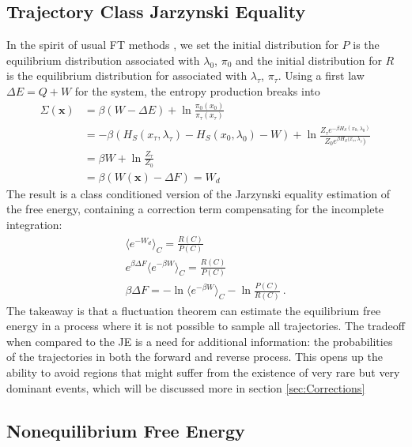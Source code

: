 \documentclass[paper=a4, fontsize=10pt]{article} %
\numberwithin{equation}{section} %
\numberwithin{figure}{section} %
\numberwithin{table}{section} %
\def\avg#1{\langle #1 \rangle}
\def \x {\mathbf{x} }
\begin{document}
\subsection{Trajectory Class Jarzynski Equality}\label{sec:TCJE}
In the spirit of usual FT methods , we set the initial distribution for $P$ is the equilibrium distribution associated with $\lambda_0$, $\pi_0$ and the initial distribution for $R$ is the equilibrium distribution for associated with $\lambda_\tau$, $\pi_\tau$. Using a first law $\Delta E = Q + W$ for the system, the entropy production breaks into
\begin{align}
\Sigma(\x) &= \beta (W-\Delta E) +  \ln \frac{\pi_0(x_0)}{\pi_\tau(x_\tau) }\\
 &= -\beta (H_S(x_\tau,\lambda_\tau)-H_S(x_0,\lambda_0) - W) + \ln \frac{ Z_\tau e^{-\beta H_S(x_0,\lambda_0)}}{Z_0 e^{\beta H_S(x_\tau,\lambda_\tau})} \\
 &= \beta W + \ln \frac{ Z_\tau}{Z_0} \\
&= \beta( W(\x) -  \Delta F) = W_d
\end{align}
The result is a class conditioned version of the Jarzynski equality estimation of the free energy, containing a correction term compensating for the incomplete integration:
\begin{align}
\label{eq:TCFTJarzynski}
 \avg{e^{-W_d}}_{C}= \frac{R(C)}{P(C)} \\
e^{\beta \Delta F} \avg{ e^{-\beta W}}_C =  \frac{R(C)}{P(C)} \\
\beta  \Delta F = - \ln \avg{ e^{-\beta W}}_C - \ln \frac{P(C)}{R(C)}  
~.
\end{align}
The takeaway is that a fluctuation theorem can estimate the equilibrium free energy in a process where it is not possible to sample all trajectories. The tradeoff when compared to the JE is a need for additional information: the probabilities of the trajectories in both the forward and reverse process. This opens up the ability to avoid regions that might suffer from the existence of very rare but very dominant events, which will be discussed more in section \ref{sec:Corrections}

\subsection{Nonequilibrium Free Energy}
\end{document}
